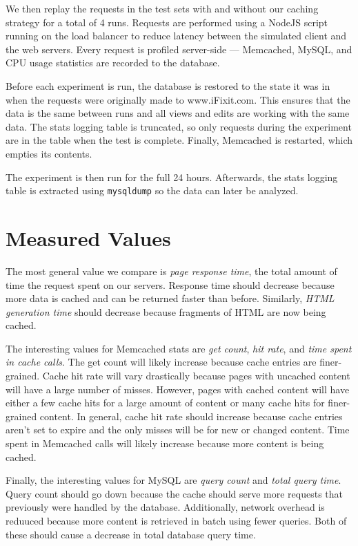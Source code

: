 \documentclass[12pt]{ucthesis}
\begin{document}
We then replay the requests in the test sets with and without our caching strategy for a total of 4 runs.
Requests are performed using a NodeJS script running on the load balancer to reduce latency between the simulated client and the web servers.
Every request is profiled server-side --- \textsf{Memcached}, \textsf{MySQL}, and CPU usage statistics are recorded to the database.

Before each experiment is run, the database is restored to the state it was in when the requests were originally made to \textsf{www.iFixit.com}.
This ensures that the data is the same between runs and all views and edits are working with the same data.
The stats logging table is truncated, so only requests during the experiment are in the table when the test is complete.
Finally, \textsf{Memcached} is restarted, which empties its contents.

The experiment is then run for the full 24 hours.
Afterwards, the stats logging table is extracted using {\tt mysqldump} so the data can later be analyzed.

\section{Measured Values}
The most general value we compare is \textit{page response time}, the total amount of time the request spent on our servers.
Response time should decrease because more data is cached and can be returned faster than before.
Similarly, \textit{HTML generation time} should decrease because fragments of HTML are now being cached.

The interesting values for \textsf{Memcached} stats are \textit{get count}, \textit{hit rate}, and \textit{time spent in cache calls}.
The get count will likely increase because cache entries are finer-grained.
Cache hit rate will vary drastically because pages with uncached content will have a large number of misses.
However, pages with cached content will have either a few cache hits for a large amount of content or many cache hits for finer-grained content.
In general, cache hit rate should increase because cache entries aren't set to expire and the only misses will be for new or changed content.
Time spent in \textsf{Memcached} calls will likely increase because more content is being cached.

Finally, the interesting values for \textsf{MySQL} are \textit{query count} and \textit{total query time}.
Query count should go down because the cache should serve more requests that previously were handled by the database.
Additionally, network overhead is reduuced because more content is retrieved in batch using fewer queries.
Both of these should cause a decrease in total database query time.
\end{document}
